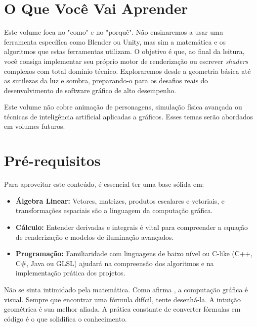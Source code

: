 \section{O Que Você Vai Aprender}

Este volume foca no "como" e no "porquê". Não ensinaremos a usar uma ferramenta específica como Blender ou Unity, mas sim a matemática e os algoritmos que estas ferramentas utilizam. O objetivo é que, ao final da leitura, você consiga implementar seu próprio motor de renderização ou escrever \textit{shaders} complexos com total domínio técnico. Exploraremos desde a geometria básica até as sutilezas da luz e sombra, preparando-o para os desafios reais do desenvolvimento de software gráfico de alto desempenho.

\begin{aviso}
    Este volume não cobre animação de personagens, simulação física avançada ou técnicas de inteligência artificial aplicadas a gráficos. Esses temas serão abordados em volumes futuros.
\end{aviso}

\section{Pré-requisitos}

Para aproveitar este conteúdo, é essencial ter uma base sólida em:
\begin{itemize}
    \item \textbf{Álgebra Linear:} Vetores, matrizes, produtos escalares e vetoriais, e transformações espaciais são a linguagem da computação gráfica.
    \item \textbf{Cálculo:} Entender derivadas e integrais é vital para compreender a equação de renderização e modelos de iluminação avançados.
    \item \textbf{Programação:} Familiaridade com linguagens de baixo nível ou C-like (C++, C\#, Java ou GLSL) ajudará na compreensão dos algoritmos e na implementação prática dos projetos.
\end{itemize}

\begin{dica}
    Não se sinta intimidado pela matemática. Como afirma \textcite{shirley2021fundamentals}, a computação gráfica é visual. Sempre que encontrar uma fórmula difícil, tente desenhá-la. A intuição geométrica é sua melhor aliada. A prática constante de converter fórmulas em código é o que solidifica o conhecimento.
\end{dica}

